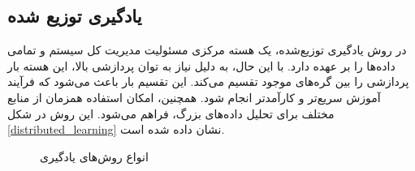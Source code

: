 \subsection{
	یادگیری توزیع شده%
}
در روش یادگیری توزیع‌شده، یک هسته مرکزی مسئولیت مدیریت کل سیستم و تمامی داده‌ها را بر عهده دارد. با این حال، به دلیل نیاز به توان پردازشی بالا، این هسته بار پردازشی را بین گره‌های موجود تقسیم می‌کند. این تقسیم بار باعث می‌شود که فرآیند آموزش سریع‌تر و کارآمدتر انجام شود. همچنین، امکان استفاده همزمان از منابع مختلف برای تحلیل داده‌های بزرگ، فراهم می‌شود.
این روش در شکل
\ref{distributed_learning}
نشان داده شده است.


\begin{figure}[b]
	\centering
	\hspace{0.5mm}
	\hspace{0.5mm}
	\caption{انواع روش‌های یادگیری}
	\label{learning_methods}
\end{figure}



